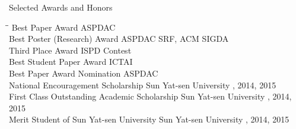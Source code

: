 
\begin{rSection}{Selected Awards and Honors}
\begin{tabbing}
\hspace{3.2in}\= \hspace{2.8in}\=\kill
    Best Paper Award                   \>ASPDAC                         \\

    Best Poster (Research) Award      \> ASPDAC SRF, ACM SIGDA        \\

    Third Place Award                 \> ISPD Contest        \\

    Best Student Paper Award                     \>ICTAI                         \\

    Best Paper Award Nomination                  \>ASPDAC                         \\

    National Encouragement Scholarship      \> Sun Yat-sen University     , 2014, 2015 \\

    First Class Outstanding Academic Scholarship             \> Sun Yat-sen University     , 2014, 2015 \\

    Merit Student of Sun Yat-sen University                   \> Sun Yat-sen University     , 2014, 2015 \\
\end{tabbing}
\end{rSection}

